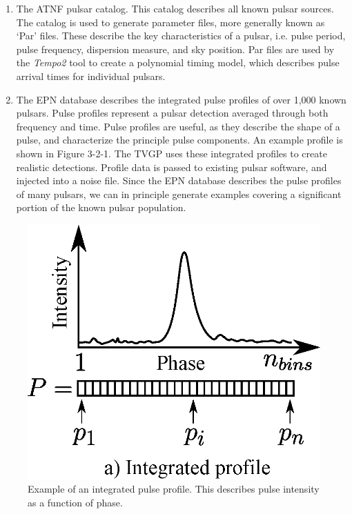 \documentclass[preprint,authoryear,5p,twocolumn]{elsarticle_mod}
\begin{document}
\begin{enumerate}
\begin{itemize}
\end{itemize}
\item The ATNF pulsar catalog. This catalog describes all known pulsar sources. The catalog is used to generate parameter files, more generally known as `Par' files. These describe the key characteristics of a pulsar, i.e. pulse period, pulse frequency, dispersion measure, and sky position. Par files are used by the \textit{Tempo2} tool to create a polynomial timing model, which describes pulse arrival times for individual pulsars. 
\item The EPN database describes the integrated pulse profiles of over 1,000 known pulsars. Pulse profiles represent a pulsar detection averaged through both frequency and time. Pulse profiles are useful, as they describe the shape of a pulse, and characterize the principle pulse components. An example profile is shown in Figure 3-2-1. The TVGP uses these integrated profiles to create realistic detections. Profile data is passed to existing pulsar software, and injected into a noise file. Since the EPN database describes the pulse profiles of many pulsars, we can in principle generate examples covering a significant portion of the known pulsar population. 
\end{enumerate}

\begin{figure}
	\centering
		\includegraphics[scale=0.5]{images/eps/Integrated_profile.eps}
		\caption[]{Example of an integrated pulse profile. This describes pulse intensity as a function of phase.}
	\label{Fig:Profile}
\end{figure}
\end{document}
